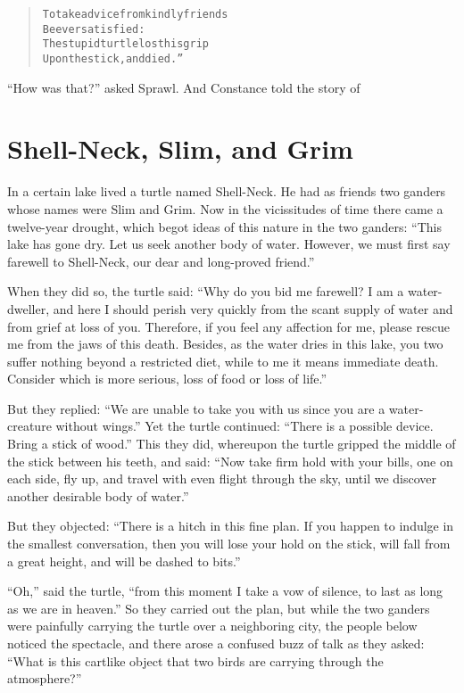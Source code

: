\documentclass[article, twoside, 14pt]{memoir}
\renewenvironment{verbatim}{%
\begin{quote}%
\vskip -10pt%
\begin{alltt}\normalfont\large}{\end{alltt}%
\end{quote}%
\vskip -10pt
} %
\begin{document}
\begin{verbatim}
To take advice from kindly friends
Be ever satisfied:
The stupid turtle lost his grip
Upon the stick, and died.”
\end{verbatim}
``How was that?'' asked Sprawl. And Constance told the story of

\chapter{Shell-Neck, Slim, and Grim}

\label{s19}

In a certain lake lived a turtle named Shell-Neck. He had as
friends two ganders whose names were Slim and Grim. Now in the
vicissitudes of time there came a twelve-year drought, which begot
ideas of this nature in the two ganders:
``This lake has gone dry. Let us seek another body of water. However, we must first say farewell to Shell-Neck, our dear and long-proved friend.''

When they did so, the turtle said:
``Why do you bid me farewell? I am a water-dweller, and here I should perish very quickly from the scant supply of water and from grief at loss of you. Therefore, if you feel any affection for me, please rescue me from the jaws of this death. Besides, as the water dries in this lake, you two suffer nothing beyond a restricted diet, while to me it means immediate death. Consider which is more serious, loss of food or loss of life.''

But they replied:
``We are unable to take you with us since you are a water-creature without wings.''
Yet the turtle continued:
``There is a possible device. Bring a stick of wood.'' This they
did, whereupon the turtle gripped the middle of the stick between
his teeth, and said:
``Now take firm hold with your bills, one on each side, fly up, and travel with even flight through the sky, until we discover another desirable body of water.''

But they objected:
``There is a hitch in this fine plan. If you happen to indulge in the smallest conversation, then you will lose your hold on the stick, will fall from a great height, and will be dashed to bits.''

``Oh,'' said the turtle,
``from this moment I take a vow of silence, to last as long as we are in heaven.''
So they carried out the plan, but while the two ganders were
painfully carrying the turtle over a neighboring city, the people
below noticed the spectacle, and there arose a confused buzz of
talk as they asked:
``What is this cartlike object that two birds are carrying through the atmosphere?''
\end{document}
